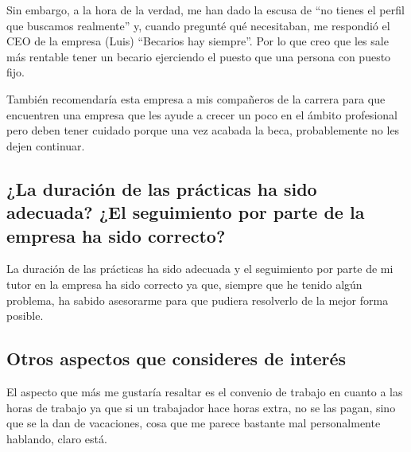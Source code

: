 \documentclass[12pt,letterpaper]{article}
\begin{document}
Sin embargo, a la hora de la verdad, me han dado la escusa de ``no tienes el perfil que buscamos realmente'' y, cuando pregunté qué necesitaban, me respondió el CEO de la empresa (Luis) ``Becarios hay siempre''. Por lo que creo que les sale más rentable tener un becario ejerciendo el puesto que una persona con puesto fijo.

También recomendaría esta empresa a mis compañeros de la carrera para que encuentren una empresa que les ayude a crecer un poco en el ámbito profesional pero deben tener cuidado porque una vez acabada la beca, probablemente no les dejen continuar.

\subsection{¿La duración de las prácticas ha sido adecuada? ¿El seguimiento por parte de la empresa ha sido correcto?}
La duración de las prácticas ha sido adecuada y el seguimiento por parte de mi tutor en la empresa ha sido correcto ya que, siempre que he tenido algún problema, ha sabido asesorarme para que pudiera resolverlo de la mejor forma posible.

\subsection{Otros aspectos que consideres de interés}
El aspecto que más me gustaría resaltar es el convenio de trabajo en cuanto a las horas de trabajo ya que si un trabajador hace horas extra, no se las pagan, sino que se la dan de vacaciones, cosa que me parece bastante mal personalmente hablando, claro está.
\end{document}
